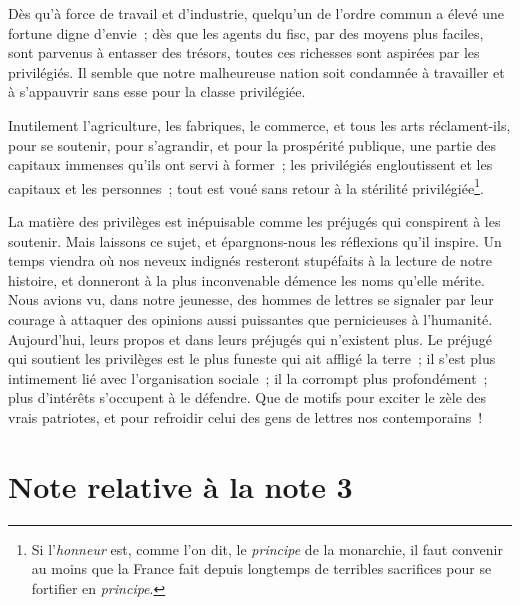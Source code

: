 \documentclass[french,twoside]{book} %
\begin{document}
Dès qu’à force de travail et d’industrie, quelqu’un de l’ordre commun a élevé une fortune digne d’envie ; dès que les agents du fisc, par des moyens plus faciles, sont parvenus à entasser des trésors, toutes ces richesses sont aspirées par les privilégiés. Il semble que notre malheureuse nation soit condamnée à travailler et à s’appauvrir sans esse pour la classe privilégiée.\par
Inutilement l’agriculture, les fabriques, le commerce, et tous les arts réclament-ils, pour se soutenir, pour s’agrandir, et pour la prospérité publique, une partie des capitaux immenses qu’ils ont servi à former ; les privilégiés engloutissent et les capitaux et les personnes ; tout est voué sans retour à la stérilité privilégiée\footnote{Si l’{\itshape honneur} est, comme l’on dit, le {\itshape principe} de la monarchie, il faut convenir au moins que la France fait depuis longtemps de terribles sacrifices pour se fortifier en {\itshape principe}.}.\par
La matière des privilèges est inépuisable comme les préjugés qui conspirent à les soutenir. Mais laissons ce sujet, et épargnons-nous les réflexions qu’il inspire. Un temps viendra où nos neveux indignés resteront stupéfaits à la lecture de notre histoire, et donneront à la plus inconvenable démence les noms qu’elle mérite. Nous avions vu, dans notre jeunesse, des hommes de lettres se signaler par leur courage à attaquer des opinions aussi puissantes que pernicieuses à l’humanité. Aujourd’hui, leurs propos et dans leurs préjugés qui n’existent plus. Le préjugé qui soutient les privilèges est le plus funeste qui ait affligé la terre ; il s’est plus intimement lié avec l’organisation sociale ; il la corrompt plus profondément ; plus d’intérêts s’occupent à le défendre. Que de motifs pour exciter le zèle des vrais patriotes, et pour refroidir celui des gens de lettres nos contemporains !
\section[{Note relative à la note 3}]{Note relative à la note 3}
\label{essai\_privileges\_note\_3}\renewcommand{\leftmark}{Note relative à la note 3}
\end{document}
